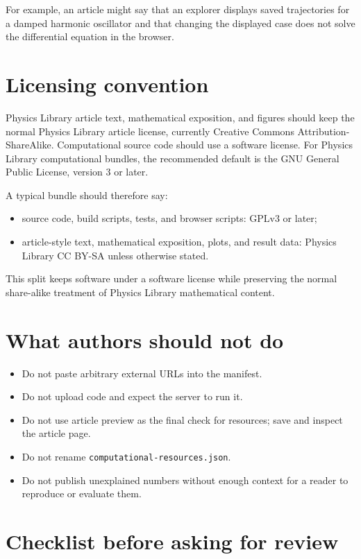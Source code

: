 For example, an article might say that an explorer displays saved trajectories
for a damped harmonic oscillator and that changing the displayed case does not
solve the differential equation in the browser.

\section{Licensing convention}

Physics Library article text, mathematical exposition, and figures should keep
the normal Physics Library article license, currently Creative Commons
Attribution-ShareAlike.  Computational source code should use a software
license.  For Physics Library computational bundles, the recommended default is
the GNU General Public License, version 3 or later.

A typical bundle should therefore say:
\begin{itemize}
\item source code, build scripts, tests, and browser scripts: GPLv3 or later;
\item article-style text, mathematical exposition, plots, and result data:
      Physics Library CC BY-SA unless otherwise stated.
\end{itemize}

This split keeps software under a software license while preserving the normal
share-alike treatment of Physics Library mathematical content.

\section{What authors should not do}

\begin{itemize}
\item Do not paste arbitrary external URLs into the manifest.
\item Do not upload code and expect the server to run it.
\item Do not use article preview as the final check for resources; save and
      inspect the article page.
\item Do not rename \texttt{computational-resources.json}.
\item Do not publish unexplained numbers without enough context for a reader to
      reproduce or evaluate them.
\end{itemize}

\section{Checklist before asking for review}

